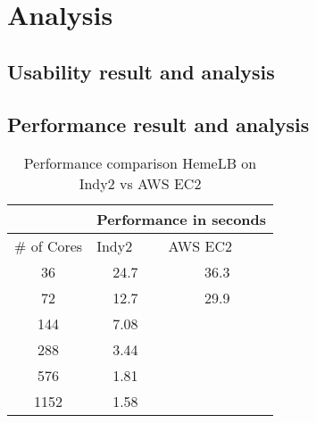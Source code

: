  

\chapter[Analysis]{Analysis}

\section{Usability result and analysis}


\section{Performance result and analysis}


\begin{table}[]
\centering
\caption{Performance comparison HemeLB on Indy2 vs AWS EC2}
\label{table:perf}
\begin{tabular}{|c|c|c|}
\hline
\multicolumn{1}{|l|}{}            & \multicolumn{2}{c|}{Performance in seconds}               \\ \hline
\multicolumn{1}{|l|}{\# of Cores} & \multicolumn{1}{l|}{Indy2} & \multicolumn{1}{l|}{AWS EC2} \\ \hline
36                                & 24.7                       & 36.3                         \\ \hline
72                                & 12.7                       & 29.9                         \\ \hline
144                               & 7.08                       &                              \\ \hline
288                               & 3.44                       &                              \\ \hline
576                               & 1.81                       &                              \\ \hline
1152                              & 1.58                       &                              \\ \hline
\end{tabular}
\end{table}